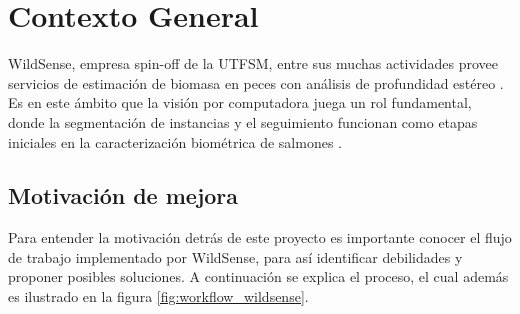 \label{part:chap1_introducción}
\section{Contexto General}
WildSense, empresa spin-off de la UTFSM, entre sus muchas actividades provee servicios de estimación de biomasa en peces con análisis de profundidad estéreo \cite{wildsense-1}. Es en este ámbito que la visión por computadora juega un rol fundamental, donde la segmentación de instancias y el seguimiento funcionan como etapas iniciales en la caracterización biométrica de salmones \cite{wildsense-2}. %

\subsection{Motivación de mejora}
\label{sec:workflow_wildsense}
Para entender la motivación detrás de este proyecto es importante conocer el flujo de trabajo implementado por WildSense, para así identificar debilidades y proponer posibles soluciones. A continuación se explica el proceso, el cual además es ilustrado en la figura \ref{fig:workflow_wildsense}.

